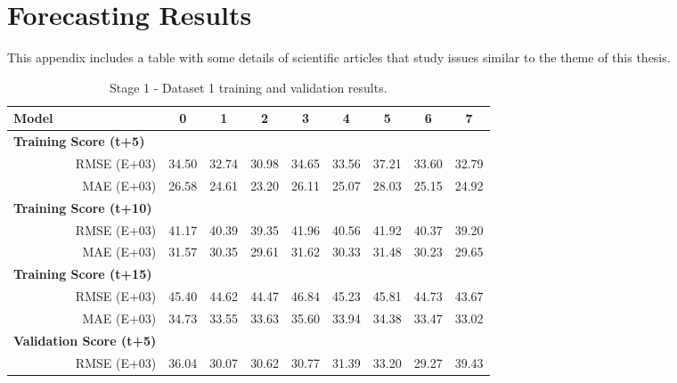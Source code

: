 \chapter{Forecasting Results}


\label{chapter:appendixC}

This appendix includes a table with some details of scientific articles that study issues similar to the theme of this thesis.



\begin{table}[htbp]
  \centering
  \caption{Stage 1 - Dataset 1 training and validation results.}
    \begin{tabular}{cr|cccccccc}
    \toprule
    \multicolumn{1}{l}{\textbf{Model}} &       & 0     & 1     & 2     & 3     & 4     & 5     & 6     & 7 \\
    \midrule
    \multicolumn{2}{l|}{\textbf{Training Score (t+5)}} &       &       &       &       &       &       &       &  \\
          & RMSE (E+03) & 34.50 & 32.74 & 30.98 & 34.65 & 33.56 & 37.21 & 33.60 & 32.79 \\
          & MAE (E+03) & 26.58 & 24.61 & 23.20 & 26.11 & 25.07 & 28.03 & 25.15 & 24.92 \\
    \multicolumn{2}{l|}{\textbf{Training Score (t+10)}} &       &       &       &       &       &       &       &  \\
          & RMSE (E+03) & 41.17 & 40.39 & 39.35 & 41.96 & 40.56 & 41.92 & 40.37 & 39.20 \\
          & MAE (E+03) & 31.57 & 30.35 & 29.61 & 31.62 & 30.33 & 31.48 & 30.23 & 29.65 \\
    \multicolumn{2}{l|}{\textbf{Training Score (t+15)}} &       &       &       &       &       &       &       &  \\
          & RMSE (E+03) & 45.40 & 44.62 & 44.47 & 46.84 & 45.23 & 45.81 & 44.73 & 43.67 \\
          & MAE (E+03) & 34.73 & 33.55 & 33.63 & 35.60 & 33.94 & 34.38 & 33.47 & 33.02 \\
    \midrule
    \multicolumn{2}{l|}{\textbf{Validation Score (t+5)}} &       &       &       &       &       &       &       &  \\
          & RMSE (E+03) & 36.04 & 30.07 & 30.62 & 30.77 & 31.39 & 33.20 & 29.27 & 39.43 \\

\end{tabular}
\end{table}
